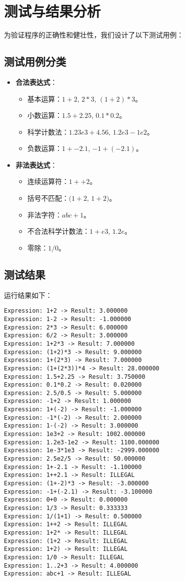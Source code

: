 \documentclass[UTF8]{ctexart}
\begin{document}
\section{测试与结果分析}
为验证程序的正确性和健壮性，我们设计了以下测试用例：
\subsection{测试用例分类}
\begin{itemize}
    \item \textbf{合法表达式}：
    \begin{itemize}
        \item 基本运算：$1+2$, $2*3$, $(1+2)*3$。
        \item 小数运算：$1.5+2.25$, $0.1*0.2$。
        \item 科学计数法：$1.23e3+4.56$, $1.2e3-1e2$。
        \item 负数运算：$1+-2.1$, $-1+(-2.1)$。
    \end{itemize}
    \item \textbf{非法表达式}：
    \begin{itemize}
        \item 连续运算符：$1++2$。
        \item 括号不匹配：$(1+2$, $1+2)$。
        \item 非法字符：$abc+1$。
        \item 不合法科学计数法：$1+e3$, $1.2e$。
        \item 零除：$1/0$。
    \end{itemize}
\end{itemize}

\subsection{测试结果}
运行结果如下：
\begin{verbatim}
Expression: 1+2 -> Result: 3.000000
Expression: 1-2 -> Result: -1.000000
Expression: 2*3 -> Result: 6.000000
Expression: 6/2 -> Result: 3.000000
Expression: 1+2*3 -> Result: 7.000000
Expression: (1+2)*3 -> Result: 9.000000
Expression: 1+(2*3) -> Result: 7.000000
Expression: (1+(2*3))*4 -> Result: 28.000000
Expression: 1.5+2.25 -> Result: 3.750000
Expression: 0.1*0.2 -> Result: 0.020000
Expression: 2.5/0.5 -> Result: 5.000000
Expression: -1+2 -> Result: 1.000000
Expression: 1+(-2) -> Result: -1.000000
Expression: -1*(-2) -> Result: 2.000000
Expression: 1-(-2) -> Result: 3.000000
Expression: 1e3+2 -> Result: 1002.000000
Expression: 1.2e3-1e2 -> Result: 1100.000000
Expression: 1e-3*1e3 -> Result: -2999.000000
Expression: 2.5e2/5 -> Result: 50.000000
Expression: 1+-2.1 -> Result: -1.100000
Expression: 1++2.1 -> Result: ILLEGAL
Expression: (1+-2)*3 -> Result: -3.000000
Expression: -1+(-2.1) -> Result: -3.100000
Expression: 0+0 -> Result: 0.000000
Expression: 1/3 -> Result: 0.333333
Expression: 1/(1+1) -> Result: 0.500000
Expression: 1++2 -> Result: ILLEGAL
Expression: 1+2* -> Result: ILLEGAL
Expression: (1+2 -> Result: ILLEGAL
Expression: 1+2) -> Result: ILLEGAL
Expression: 1/0 -> Result: ILLEGAL
Expression: 1..2+3 -> Result: 4.000000
Expression: abc+1 -> Result: ILLEGAL
\end{verbatim}
\end{document}
